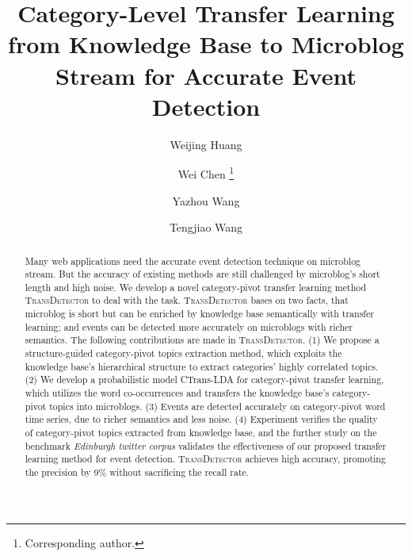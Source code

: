 \documentclass[runningheads,a4paper]{llncs}
\begin{document}
%
\title{Category-Level Transfer Learning from Knowledge Base to Microblog Stream for Accurate Event Detection}
\author{Weijing Huang \and Wei Chen \thanks{Corresponding author.} \and Yazhou Wang \and Tengjiao Wang}

\maketitle

\begin{abstract}
Many web applications need the accurate event detection technique on microblog stream. 
But the accuracy of existing methods are still challenged by microblog's short length and high noise. 
We develop a novel category-pivot transfer learning method \textsc{TransDetector} to deal with the task.  
\textsc{TransDetector} bases on two facts, that microblog is short but can be enriched by knowledge base semantically with transfer learning; and events can be detected more accurately on microblogs with richer semantics.
The following contributions are made in \textsc{TransDetector}.
(1) We propose a structure-guided category-pivot topics extraction method, which exploits the knowledge base's hierarchical structure to extract categories' highly correlated topics. 
(2) We develop a probabilistic model CTrans-LDA for category-pivot transfer learning, which utilizes the word co-occurrences and transfers the knowledge base's category-pivot topics into microblogs. 
(3) Events are detected accurately on category-pivot word time series, due to richer semantics and less noise. 
(4) Experiment verifies the quality of category-pivot topics extracted from knowledge base, and the further study on the benchmark \textit{Edinburgh twitter corpus} validates the effectiveness of our proposed transfer learning method for event detection.
\textsc{TransDetector} achieves high accuracy, promoting the precision by 9\% without  sacrificing the recall rate.

\end{abstract}
\end{document}
